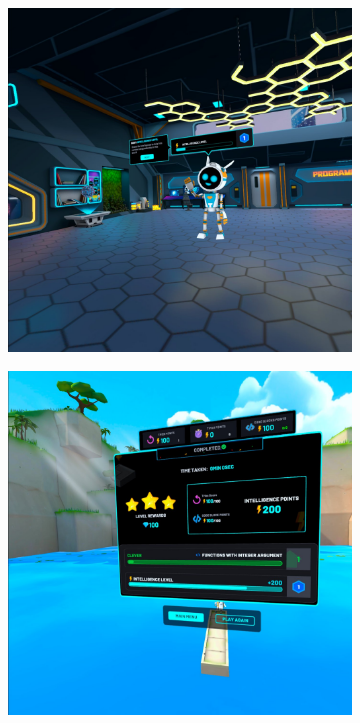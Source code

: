 \documentclass[a4paper,12pt]{article}
\begin{document}
\begin{figure}[H]
    \centering
    \begin{subfigure}[b]{0.49\textwidth}
        \centering
        \includegraphics[width=\textwidth]{screen1.jpg}
    \end{subfigure}
    \begin{subfigure}[b]{0.49\textwidth}
        \centering
        \includegraphics[width=\textwidth]{screen2.jpg}

\end{subfigure}
\end{figure}
\end{document}
